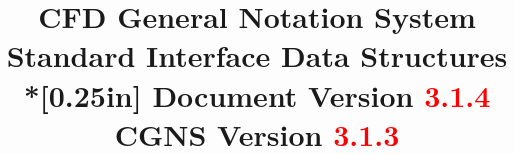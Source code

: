 \documentclass[11pt,twoside]{article}
\begin{document}
%
%
%


\fancyfoot[LE,RO]{\bfseries \thepage}

\posttitle{\par\end{flushleft}\vskip 1.0em}
\title{{\bfseries CFD General Notation System\\
Standard Interface Data Structures}\\*[0.25in]
{\Large Document Version \textcolor{red}{3.1.4}\\
CGNS Version \textcolor{red}{3.1.3}}}
\author{}
\date{}
\maketitle
\thispagestyle{empty}

\end{document}
